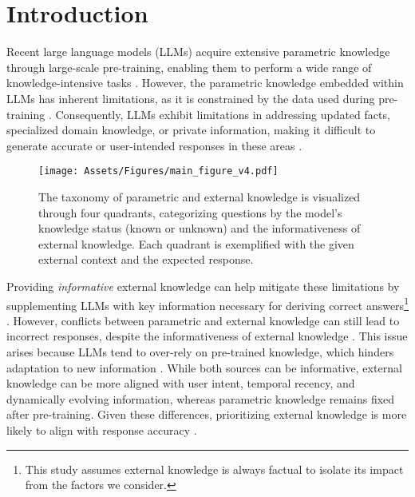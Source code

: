 \section{Introduction}


Recent large language models (LLMs) acquire extensive parametric knowledge through large-scale pre-training, enabling them to perform a wide range of knowledge-intensive tasks \citep{grattafiori2024llama3herdmodels, qwen2.5}.
However, the parametric knowledge embedded within LLMs has inherent limitations, as it is constrained by the data used during pre-training \citep{zhang2025mink}.
Consequently, LLMs exhibit limitations in addressing updated facts, specialized domain knowledge, or private information, making it difficult to generate accurate or user-intended responses in these areas \citep{mallen-etal-2023-trust, pmlr-v202-kandpal23a, pmlr-v162-liska22a}.

\begin{figure}[t]
\begin{center}
    \texttt{[image: Assets/Figures/main\_figure\_v4.pdf]}
      \caption{ 
      The taxonomy of parametric and external knowledge is visualized through four quadrants, categorizing questions by the model's knowledge status (known or unknown) and the informativeness of external knowledge.
      Each quadrant is exemplified with the given external context and the expected response.
      }
      \label{figure:front_image}
\end{center}
\end{figure}


Providing \textit{informative} external knowledge can help mitigate these limitations by supplementing LLMs with key information necessary for deriving correct answers\footnote{This study assumes external knowledge is always factual to isolate its impact from the factors we consider.} \citep{chen-etal-2017-reading, asai-etal-2023-retrieval}.
However, conflicts between parametric and external knowledge can still lead to incorrect responses, despite the informativeness of external knowledge \citep{longpre-etal-2021-entity, xie2023adaptive}.
This issue arises because LLMs tend to over-rely on pre-trained knowledge, which hinders adaptation to new information \citep{shi-etal-2024-trusting, jin-etal-2024-cutting}.
While both sources can be informative, external knowledge can be more aligned with user intent, temporal recency, and dynamically evolving information, whereas parametric knowledge remains fixed after pre-training. 
Given these differences, prioritizing external knowledge is more likely to align with response accuracy \citep{li-etal-2023-large}.



